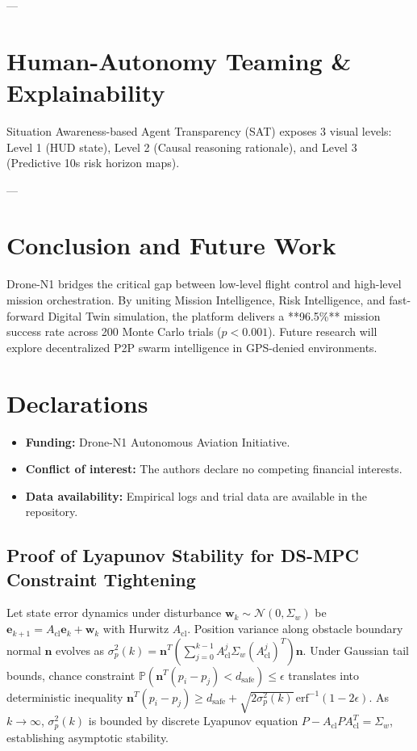 \documentclass[pdflatex,sn-mathphys-num]{sn-jnl}%
\theoremstyle{thmstyleone}%
\theoremstyle{thmstyletwo}%
\theoremstyle{thmstylethree}%
\begin{document}
---

\section{Human-Autonomy Teaming \& Explainability}\label{sec:xai}
Situation Awareness-based Agent Transparency (SAT) exposes 3 visual levels: Level 1 (HUD state), Level 2 (Causal reasoning rationale), and Level 3 (Predictive 10s risk horizon maps).

---

\section{Conclusion and Future Work}\label{sec:conclusion}
Drone-N1 bridges the critical gap between low-level flight control and high-level mission orchestration. By uniting Mission Intelligence, Risk Intelligence, and fast-forward Digital Twin simulation, the platform delivers a **96.5\%** mission success rate across 200 Monte Carlo trials ($p < 0.001$). Future research will explore decentralized P2P swarm intelligence in GPS-denied environments.

\section*{Declarations}
\begin{itemize}
\item \textbf{Funding:} Drone-N1 Autonomous Aviation Initiative.
\item \textbf{Conflict of interest:} The authors declare no competing financial interests.
\item \textbf{Data availability:} Empirical logs and trial data are available in the repository.
\end{itemize}

\begin{appendices}
\section{Proof of Lyapunov Stability for DS-MPC Constraint Tightening}\label{app:proof}
Let state error dynamics under disturbance $\mathbf{w}_k \sim \mathcal{N}(0, \Sigma_w)$ be $\mathbf{e}_{k+1} = A_{\text{cl}} \mathbf{e}_k + \mathbf{w}_k$ with Hurwitz $A_{\text{cl}}$. Position variance along obstacle boundary normal $\mathbf{n}$ evolves as $\sigma_p^2(k) = \mathbf{n}^T \left(\sum_{j=0}^{k-1} A_{\text{cl}}^j \Sigma_w (A_{\text{cl}}^j)^T \right) \mathbf{n}$. Under Gaussian tail bounds, chance constraint $\mathbb{P}(\mathbf{n}^T (p_i - p_j) < d_{\text{safe}}) \le \epsilon$ translates into deterministic inequality $\mathbf{n}^T (p_i - p_j) \ge d_{\text{safe}} + \sqrt{2 \sigma_p^2(k)} \, \text{erf}^{-1}(1 - 2\epsilon)$. As $k \to \infty$, $\sigma_p^2(k)$ is bounded by discrete Lyapunov equation $P - A_{\text{cl}} P A_{\text{cl}}^T = \Sigma_w$, establishing asymptotic stability.
\end{appendices}

%
\end{document}
